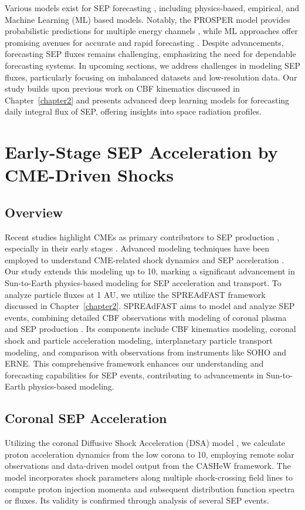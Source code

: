 Various models exist for SEP forecasting \citep{whitman_2022}, including physics-based, empirical, and Machine Learning (ML) based models. Notably, the PROSPER model provides probabilistic predictions for multiple energy channels \citep{papaioannou_2022}, while ML approaches offer promising avenues for accurate and rapid forecasting \citep{lavasa_2021, kasapis_2022}. Despite advancements, forecasting SEP fluxes remains challenging, emphasizing the need for dependable forecasting systems.
In upcoming sections, we address challenges in modeling SEP fluxes, particularly focusing on imbalanced datasets and low-resolution data. Our study builds upon previous work on CBF kinematics discussed in Chapter~\ref{chapter2} and presents advanced deep learning models for forecasting daily integral flux of SEP, offering insights into space radiation profiles.

\section{Early-Stage SEP Acceleration by CME-Driven Shocks}
\subsection{Overview}
Recent studies highlight CMEs as primary contributors to SEP production \citep{reames_1999}, especially in their early stages \citep{ontiveross_2009, gopalswamy_2011}. Advanced modeling techniques have been employed to understand CME-related shock dynamics and SEP acceleration \citep{kozarev_2019, kozarev_2016, kozarev_2022}. Our study extends this modeling up to 10\rsun, marking a significant advancement in Sun-to-Earth physics-based modeling for SEP acceleration and transport. To analyze particle fluxes at 1 AU, we utilize the SPREAdFAST framework discussed in Chapter~\ref{chapter2}.
SPREAdFAST aims to model and analyze SEP events, combining detailed CBF observations with modeling of coronal plasma and SEP production \citep{kozarev_2022}. Its components include CBF kinematics modeling, coronal shock and particle acceleration modeling, interplanetary particle transport modeling, and comparison with observations from instruments like SOHO and ERNE. This comprehensive framework enhances our understanding and forecasting capabilities for SEP events, contributing to advancements in Sun-to-Earth physics-based modeling.

\subsection{Coronal SEP Acceleration}
Utilizing the coronal Diffusive Shock Acceleration (DSA) model \citep{kozarev_2016, kozarev_2019}, we calculate proton acceleration dynamics from the low corona to 10\rsun, employing remote solar observations and data-driven model output from the CASHeW framework. The model incorporates shock parameters along multiple shock-crossing field lines to compute proton injection momenta and subsequent distribution function spectra or fluxes. Its validity is confirmed through analysis of several SEP events.

